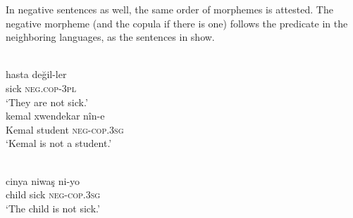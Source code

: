 \documentclass[output=paper]{langsci/langscibook}
\begin{document}











\noindent In negative sentences as well, the same order of morphemes is attested. The negative morpheme (and the {copula} if there is one) follows the predicate in the neighboring languages, as the sentences in  show.


\begin{exe}
\ex \label{copneg}
		\begin{xlist}
		\ex {} \\\label{copnegtk}\gll hasta 	değil-ler		\\
    sick	\textsc{neg.cop-3pl} \\
       \glt `They are not sick.'
	\ex {} \\\label{copnegkr}  \gll kemal	xwendekar  	nîn-e	 \\
    Kemal	student		\textsc{neg-cop.3sg}\\
    \glt    `Kemal is not a student.'

		\ex {} \\ \label{copnegza} \gll  cinya 	niwaş   ni-yo\\
        child	sick	\textsc{neg-cop.3sg} \\
        \glt `The child is not sick.'
        \end{xlist}

\end{exe}
\end{document}
